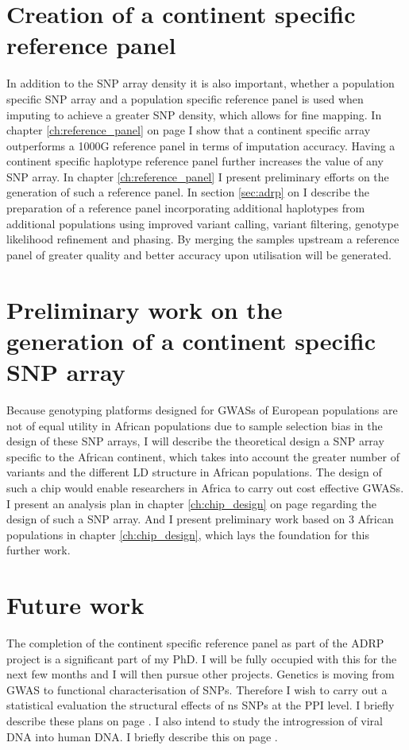 \section{Creation of a continent specific reference panel}
In addition to the \gls{SNP} array density it is also important, whether a population specific \gls{SNP} array and a population specific reference panel is used when imputing to achieve a greater SNP density, which allows for fine mapping. In chapter \ref{ch:reference_panel} on page \pageref{ch:reference_panel} I show that a continent specific array outperforms a 1000G reference panel in terms of imputation accuracy. Having a continent specific haplotype reference panel further increases the value of any SNP array. In chapter \ref{ch:reference_panel} I present preliminary efforts on the generation of such a reference panel. In section \ref{sec:adrp} on \pageref{sec:adrp} I describe the preparation of a reference panel incorporating additional haplotypes from additional populations using improved variant calling, variant filtering, genotype likelihood refinement and phasing. By merging the samples upstream a reference panel of greater quality and better accuracy upon utilisation will be generated.

\section{Preliminary work on the generation of a continent specific SNP array}
Because genotyping platforms designed for \glspl{GWAS} of European populations are not of equal utility in African populations due to sample selection bias in the design of these \gls{SNP} arrays, I will describe the theoretical design a \gls{SNP} array specific to the African continent, which takes into account the greater number of variants and the different \gls{LD} structure in African populations. The design of such a chip would enable researchers in Africa to carry out cost effective \glspl{GWAS}. I present an analysis plan in chapter \ref{ch:chip_design} on page \pageref{ch:chip_design} regarding the design of such a \gls{SNP} array. And I present preliminary work based on 3 African populations in chapter \ref{ch:chip_design}, which lays the foundation for this further work.

\section{Future work}
The completion of the continent specific reference panel as part of the \gls{ADRP} project is a significant part of my \gls{PhD}. I will be fully occupied with this for the next few months and I will then pursue other projects. Genetics is moving from \gls{GWAS} to functional characterisation of \glspl{SNP}. Therefore I wish to carry out a statistical evaluation the structural effects of \gls{ns} \glspl{SNP} at the \gls{PPI} level. I briefly describe these plans on page \pageref{ch:future}. I also intend to study the introgression of viral \gls{DNA} into human \gls{DNA}. I briefly describe this on page \pageref{ch:future}.

